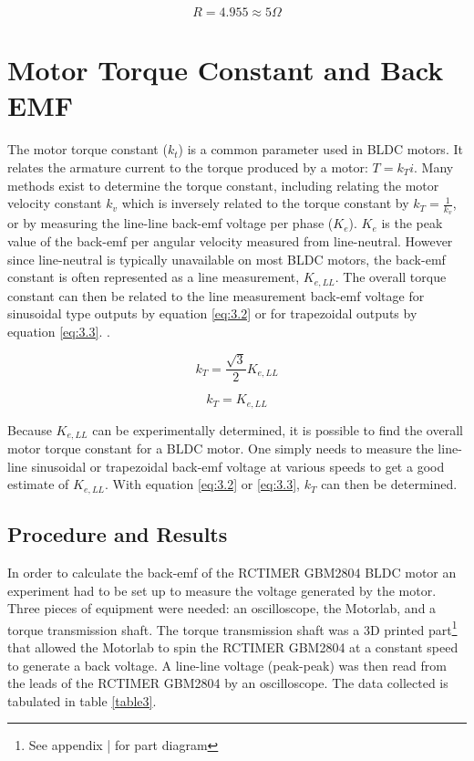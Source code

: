 \begin{tcolorbox}[standard jigsaw,
	opacityback=0]
	\[R = 4.955 \approx 5 \Omega \]
	
\end{tcolorbox}

\section{Motor Torque Constant and Back EMF}
The motor torque constant (\(k_t\)) is a common parameter used in BLDC motors. It relates the armature current to the torque produced by a motor: \(T = k_T i \). Many methods exist to determine the torque constant, including relating the motor velocity constant \(k_v\) which is inversely related to the torque constant by \(k_T = \frac{1}{k_v} \), or by measuring the line-line back-emf voltage per phase (\(K_e\)). \(K_e\) is the peak value of the back-emf per angular velocity measured from line-neutral. However since line-neutral is typically unavailable on most BLDC motors, the back-emf constant is often represented as a line measurement, \(K_{e,LL}\). The overall torque constant can then be related to the line measurement back-emf voltage for sinusoidal type outputs by equation \ref{eq:3.2} or for trapezoidal outputs by equation \ref{eq:3.3}. \citep{5}. 

\begin{equation} \label{eq:3.2}
k_T = \frac{\sqrt{3}}{2} K_{e,LL}
\end{equation}

\begin{equation} \label{eq:3.3}
k_T = K_{e,LL}
\end{equation}

Because \(K_{e,LL}\) can be experimentally determined, it is possible to find the overall motor torque constant for a BLDC motor. One simply needs to measure the line-line sinusoidal or trapezoidal back-emf voltage at various speeds to get a good estimate of \(K_{e,LL}\). With equation \ref{eq:3.2} or \ref{eq:3.3}, \(k_T\) can then be determined.

\subsection{Procedure and Results}
In order to calculate the back-emf of the RCTIMER GBM2804 BLDC motor an experiment had to be set up to measure the voltage generated by the motor. Three pieces of equipment were needed: an oscilloscope, the Motorlab, and a torque transmission shaft. The torque transmission shaft was a 3D printed part\footnote{See appendix | for part diagram} that allowed the Motorlab to spin the RCTIMER GBM2804 at a constant speed to generate a back voltage. A line-line voltage (peak-peak) was then read from the leads of the RCTIMER GBM2804 by an oscilloscope. The data collected is tabulated in table \ref{table3}.

